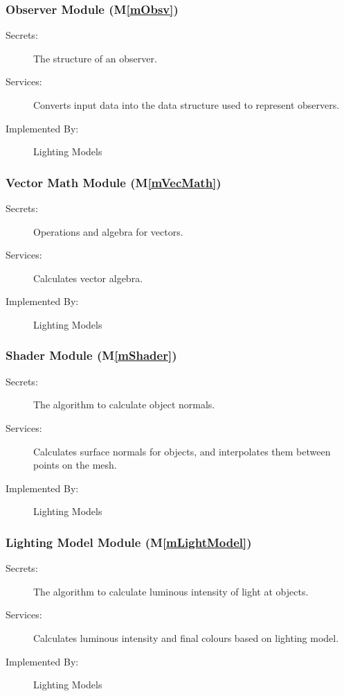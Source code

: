 \documentclass[12pt, titlepage]{article}
\newcommand{\mref}[1]{M\ref{#1}}
\begin{document}
\subsubsection{Observer Module (\mref{mObsv})}
\begin{description}
	\item[Secrets:]The structure of an observer.
	\item[Services:]Converts input data into the data structure used to 
	represent observers.
	\item[Implemented By:] Lighting Models
\end{description}

\subsubsection{Vector Math Module (\mref{mVecMath})}
\begin{description}
	\item[Secrets:]Operations and algebra for vectors.
	\item[Services:]Calculates vector algebra.
	\item[Implemented By:] Lighting Models
\end{description}

\subsubsection{Shader Module (\mref{mShader})}
\begin{description}
	\item[Secrets:]The algorithm to calculate object normals.
	\item[Services:]Calculates surface normals for objects, and interpolates 
	them between points on the mesh.
	\item[Implemented By:]Lighting Models
\end{description}

\subsubsection{Lighting Model Module (\mref{mLightModel})}
\begin{description}
	\item[Secrets:]The algorithm to calculate luminous intensity of light at 
	objects.
	\item[Services:]Calculates luminous intensity and final colours based on 
	lighting model.
	\item[Implemented By:] Lighting Models
\end{description}
\end{document}
